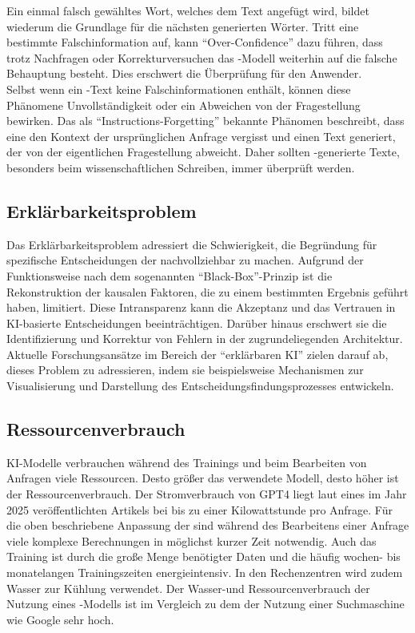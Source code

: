 \documentclass[../main.tex]{subfiles}
\begin{document}
Ein einmal falsch gewähltes Wort, welches dem Text angefügt wird, bildet wiederum die Grundlage für die nächsten generierten Wörter. Tritt eine bestimmte Falschinformation auf, 
kann "`Over-Confidence"' dazu führen, dass trotz Nachfragen oder Korrekturversuchen das -Modell weiterhin auf die falsche Behauptung besteht. Dies erschwert die 
Überprüfung für den Anwender.\cite{allgemHalluzinationen,softmax} \\
Selbst wenn ein -Text keine Falschinformationen enthält, können diese Phänomene Unvollständigkeit oder ein Abweichen von der Fragestellung bewirken. Das als 
"`Instructions-Forgetting"' bekannte Phänomen beschreibt, dass eine  den Kontext der ursprünglichen Anfrage vergisst und einen Text generiert, der von der 
eigentlichen Fragestellung abweicht. Daher sollten -generierte Texte, besonders beim wissenschaftlichen Schreiben, immer überprüft werden.\cite{allgemHalluzinationen}


\subsection{Erklärbarkeitsproblem}
\label{sec:erklärbarkeitsproblem}

Das Erklärbarkeitsproblem adressiert die Schwierigkeit, die Begründung für spezifische Entscheidungen der  nachvollziehbar zu machen. Aufgrund der Funktionsweise nach dem sogenannten 
"`Black-Box"'-Prinzip ist die Rekonstruktion der kausalen Faktoren, die zu einem bestimmten Ergebnis geführt haben, limitiert. Diese Intransparenz kann die Akzeptanz und das Vertrauen in 
KI-basierte Entscheidungen beeinträchtigen. Darüber hinaus erschwert sie die Identifizierung und Korrektur von Fehlern in der zugrundeliegenden Architektur. Aktuelle Forschungsansätze 
im Bereich der "`erklärbaren KI"' zielen darauf ab, dieses Problem zu adressieren, indem sie beispielsweise Mechanismen zur Visualisierung und Darstellung des 
Entscheidungsfindungsprozesses entwickeln.\cite{explainable}
 

\subsection{Ressourcenverbrauch}

KI-Modelle verbrauchen während des Trainings und beim Bearbeiten von Anfragen viele Ressourcen. Desto größer das verwendete Modell, desto höher ist der Ressourcenverbrauch. 
Der Stromverbrauch von GPT4 liegt laut eines im Jahr 2025 veröffentlichten Artikels bei bis zu einer Kilowattstunde pro Anfrage\cite{Energieverbrauch}. Für die oben beschriebene Anpassung der  sind während des Bearbeitens einer Anfrage viele 
komplexe Berechnungen in möglichst kurzer Zeit notwendig. Auch das Training ist durch die große Menge benötigter Daten und die häufig wochen- bis monatelangen Trainingszeiten 
energieintensiv. In den Rechenzentren wird zudem Wasser zur Kühlung verwendet. Der Wasser-und Ressourcenverbrauch der Nutzung eines -Modells ist im Vergleich zu dem der Nutzung einer 
Suchmaschine wie Google sehr hoch\cite{KINachhaltigkeit}. 
\end{document}
